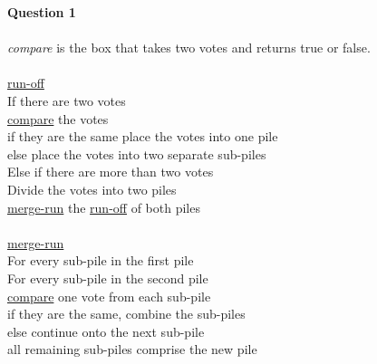 \documentclass[11pt]{article}
\begin{document}
\textbf{Question 1}\\\\
\textit{compare} is the box that takes two votes and returns true or false.
\\
\\
\underline{run-off}\\
If there are two votes\\
\indent \underline{compare} the votes\\
\indent if they are the same place the votes into one pile\\
\indent else place the votes into two separate sub-piles\\
Else if there are more than two votes\\
\indent Divide the votes into two piles\\
\indent \underline{merge-run} the \underline{run-off} of both piles
\\
\\
\underline{merge-run}\\
For every sub-pile in the first pile\\
\indent For every sub-pile in the second pile\\
\indent\indent \underline{compare} one vote from each sub-pile\\
\indent\indent if they are the same, combine the sub-piles\\
\indent\indent else continue onto the next sub-pile\\
all remaining sub-piles comprise the new pile
\end{document}
